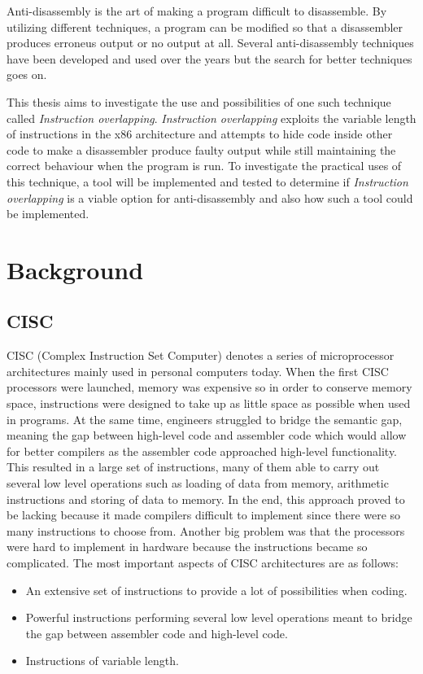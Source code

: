 \documentclass[11pt,twoside]{eitExjobb}
\begin{document}
Anti-disassembly is the art of making a program difficult to disassemble. By utilizing different techniques, a program can be modified so that a disassembler produces erroneus output or no output at all. Several anti-disassembly techniques have been developed and used over the years but the search for better techniques goes on. 

This thesis aims to investigate the use and possibilities of one such technique called \emph{Instruction overlapping}. \emph{Instruction overlapping} exploits the variable length of instructions in the x86 architecture and attempts to hide code inside other code to make a disassembler produce faulty output  while still maintaining the correct behaviour when the program is run. To investigate the practical uses of this technique, a tool will be implemented and tested to determine if \emph{Instruction overlapping} is a viable option for anti-disassembly and also how such a tool could be implemented.


\chapter{Background}
\section{CISC}
CISC (Complex Instruction Set Computer) denotes a series of microprocessor architectures mainly used in personal computers today. When the first CISC processors were launched, memory was expensive so in order to conserve memory space, instructions were designed to take up as little space as possible when used in programs. At the same time, engineers struggled to bridge the semantic gap, meaning the gap between high-level code and assembler code which would allow for better compilers as the assembler code approached high-level functionality. This resulted in a large set of instructions, many of them able to carry out several low level operations such as loading of data from memory, arithmetic instructions and storing of data to memory. In the end, this approach proved to be lacking because it made compilers difficult to implement since there were so many instructions to choose from. Another big problem was that the processors were hard to implement in hardware because the instructions became so complicated. The most important aspects of CISC architectures are as follows:\cite{datorteknik}

\begin{itemize}
\item{An extensive set of instructions to provide a lot of possibilities when coding.}
\item{Powerful instructions performing several low level operations meant to bridge the gap between assembler code and high-level code.}
\item{Instructions of variable length.}
\end{itemize}
\end{document}
